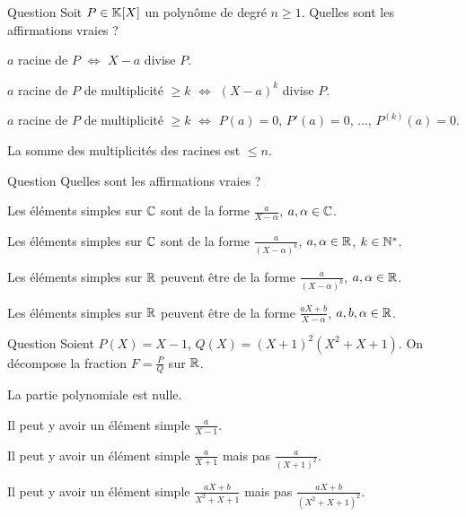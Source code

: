 \begin{multi}[multiple,feedback=
{\(a\) racine de \(P\) de multiplicité \(\ge k\) \(\iff\) \((X-a)^k\) divise \(P\) \(\iff\) \(P(a) = 0\), \(P'(a)=0\), ..., \(P^{(k-1)}(a)=0\).
}]{Question}
Soit \(P \in \mathbb{K}[X]\) un polynôme de degré \(n\ge1\).
Quelles sont les affirmations vraies ?

    \item* \(a\) racine de \(P\) \(\iff\) \(X-a\) divise \(P\).
    \item* \(a\) racine de \(P\) de multiplicité \(\ge k\) \(\iff\) \((X-a)^k\) divise \(P\).
    \item \(a\) racine de \(P\) de multiplicité \(\ge k\) \(\iff\)
\(P(a) = 0\), \(P'(a)=0\), ..., \(P^{(k)}(a)=0\).
    \item* La somme des multiplicités des racines est \(\le n\).
\end{multi}


\begin{multi}[multiple,feedback=
{Sur \(\Cc\) les éléments simples sont de la forme \(\frac{a}{(X-\alpha)^k}\), \(a,\alpha \in \Cc\), \(k\in\Nn^*\).
Sur \(\Rr\) les éléments simples sont de la forme \(\frac{a}{(X-\alpha)^k}\), \(a,\alpha \in \Rr\), \(k \in \Nn^*\) ou bien
\(\frac{aX+b}{(X^2+\alpha X+\beta)^k}\), \(a,b,\alpha,\beta \in \Rr\), \(k \in \Nn^*\) avec 
\(X^2+\alpha X+\beta\) sans racines réelles.
}]{Question}
Quelles sont les affirmations vraies ?

    \item Les éléments simples sur \(\Cc\) sont de la forme \(\frac{a}{X-\alpha}\), \(a,\alpha \in \Cc\).
    \item Les éléments simples sur \(\Cc\) sont de la forme \(\frac{a}{(X-\alpha)^k}\), \(a,\alpha \in \Rr\), \(k\in\Nn^*\).
    \item* Les éléments simples sur \(\Rr\) peuvent être de la forme \(\frac{a}{(X-\alpha)^k}\), \(a,\alpha \in \Rr\).
    \item Les éléments simples sur \(\Rr\) peuvent être de la forme \(\frac{aX+b}{X-\alpha}\), \(a,b,\alpha \in \mathbb{R}\).
\end{multi}


\begin{multi}[multiple,feedback=
{\(\frac{P(X)}{Q(X)} = \frac{X-1}{(X+1)^2(X^2+X+1)}
= \frac{-1}{X+1}+\frac{-2}{(X+1)^2}+\frac{X+2}{X^2+X+1}\).
}]{Question}
Soient \(P(X)=X-1\), \(Q(X)=(X+1)^2(X^2+X+1)\). On décompose la fraction \(F = \frac{P}{Q}\) sur \(\Rr\).

    \item* La partie polynomiale est nulle.
    \item Il peut y avoir un élément simple \(\frac{a}{X-1}\).
    \item Il peut y avoir un élément simple \(\frac{a}{X+1}\) mais pas  \(\frac{a}{(X+1)^2}\).
    \item* Il peut y avoir un élément simple \(\frac{aX+b}{X^2+X+1}\) mais pas  \(\frac{aX+b}{(X^2+X+1)^2}\).
\end{multi}


